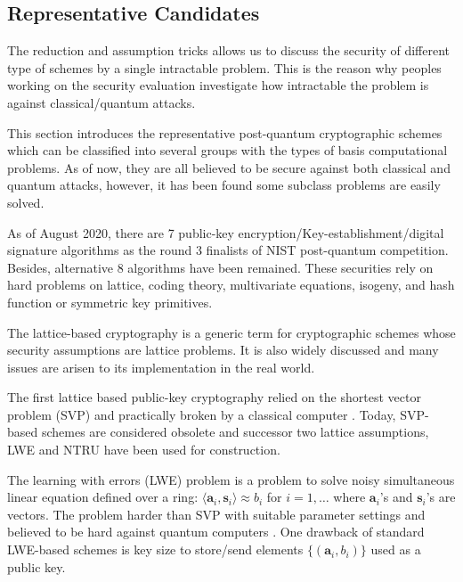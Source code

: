 


\subsection{Representative Candidates}

The reduction and assumption tricks allows us to discuss the security of different type of schemes by a single intractable problem.
This is the reason why peoples working on the security evaluation 
investigate how intractable the problem is against classical/quantum attacks.

This section introduces the representative post-quantum cryptographic schemes 
which can be classified into several groups with the types of basis computational problems.
As of now, they are all believed to be secure against both classical and quantum attacks, however, it has been found some subclass problems are easily solved. 


As of August 2020, there are 7 public-key encryption/Key-establishment/digital signature algorithms as the round 3 finalists of NIST post-quantum competition.
Besides, alternative 8 algorithms have been remained.
These securities rely on hard problems on lattice, coding theory, multivariate equations, isogeny, and hash function or symmetric key primitives.

The lattice-based cryptography is a generic term for cryptographic schemes 
whose security assumptions are lattice problems.
It is also widely discussed and many issues are arisen \cite{DS18} 
to its implementation in the real world.

The first lattice based public-key cryptography relied on the shortest vector problem (SVP) \cite{AD97} and practically broken by a classical computer \cite{NS98}.
Today, SVP-based schemes are considered obsolete and successor two lattice assumptions, LWE and NTRU have been used for construction.

The learning with errors (LWE) problem \cite{Regev05} is a problem to solve noisy simultaneous linear equation defined over a ring: $ \langle \bm{a}_i , \bm{s}_i\rangle  \approx b_i $ for $i=1,\ldots$ where $\bm{a}_i$'s and $\bm{s}_i$'s are vectors.
The problem harder than SVP with suitable parameter settings \cite{BLPRS13} and 
believed to be hard against quantum computers \cite{Regev05}.
One drawback of standard LWE-based schemes is key size to store/send elements $\{ (\bm{a}_i,b_i) \} $ used as a public key.

